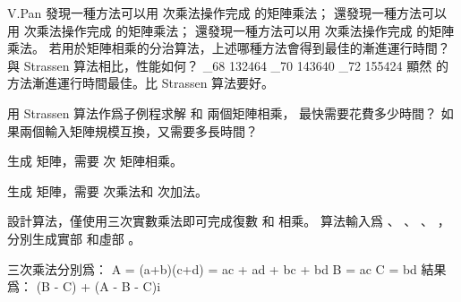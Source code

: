 \startEXERCISE
V.Pan 發現一種方法可以用  次乘法操作完成  的矩陣乘法；
還發現一種方法可以用  次乘法操作完成  的矩陣乘法；
還發現一種方法可以用  次乘法操作完成  的矩陣乘法。
若用於矩陣相乘的分治算法，上述哪種方法會得到最佳的漸進運行時間？
與 Strassen 算法相比，性能如何？
\stopEXERCISE
\startANSWER
\startformula\startalign
\NC \log_{68} 132464 \NC {} \NR
\NC \log_{70} 143640 \NC {} \NR
\NC \log_{72} 155424 \NC {} \NR
\stopalign\stopformula
顯然  的方法漸進運行時間最佳。比 Strassen 算法要好。
\stopANSWER

\startEXERCISE
用 Strassen 算法作爲子例程求解  和  兩個矩陣相乘，
最快需要花費多少時間？
如果兩個輸入矩陣規模互換，又需要多長時間？
\stopEXERCISE

\startANSWER
{} 生成  矩陣，需要  次  矩陣相乘。

 生成  矩陣，需要  次乘法和  次加法。
\stopANSWER

\startEXERCISE
設計算法，僅使用三次實數乘法即可完成復數  和  相乘。
算法輸入爲 、 、 、 ，分別生成實部  和虛部 。
\stopEXERCISE

\startANSWER
三次乘法分別爲：
\startformula\startalign
\NC A \NC = (a+b)(c+d) = ac + ad + bc + bd \NR
\NC B \NC = ac \NR
\NC C \NC = bd \NR
\stopalign\stopformula
結果爲：
\startformula
(B - C) + (A - B - C)i
\stopformula
\stopANSWER

\stopsection
